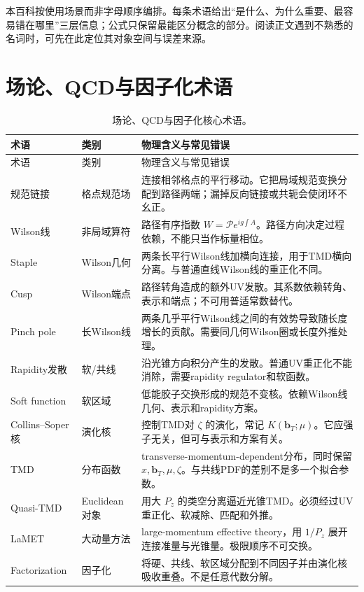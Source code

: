 \documentclass[UTF8,12pt,a4paper,twoside,openany]{ctexbook}
\newcommand{\bT}{\boldsymbol b_T}
\begin{document}
本百科按使用场景而非字母顺序编排。每条术语给出“是什么、为什么重要、最容易错在哪里”三层信息；公式只保留最能区分概念的部分。阅读正文遇到不熟悉的名词时，可先在此定位其对象空间与误差来源。

\section{场论、QCD与因子化术语}

{\small
\begin{longtable}{L{2.8cm}L{1.9cm}L{8.7cm}}
\caption{场论、QCD与因子化核心术语。}\label{tab:glossary-theory}\\
\toprule
术语 & 类别 & 物理含义与常见错误 \\
\midrule
\endfirsthead
\toprule
术语 & 类别 & 物理含义与常见错误 \\
\midrule
\endhead
\bottomrule
\endfoot
规范链接 & 格点规范场 & 连接相邻格点的平行移动。它把局域规范变换分配到路径两端；漏掉反向链接或共轭会使闭环不幺正。 \\
Wilson线 & 非局域算符 & 路径有序指数 \(W=\mathcal P e^{ig\int A}\)。路径方向决定过程依赖，不能只当作标量相位。 \\
Staple & Wilson几何 & 两条长平行Wilson线加横向连接，用于TMD横向分离。与普通直线Wilson线的重正化不同。 \\
Cusp & Wilson端点 & 路径转角造成的额外UV发散。其系数依赖转角、表示和端点；不可用普适常数替代。 \\
Pinch pole & 长Wilson线 & 两条几乎平行Wilson线之间的有效势导致随长度增长的贡献。需要同几何Wilson圈或长度外推处理。 \\
Rapidity发散 & 软/共线 & 沿光锥方向积分产生的发散。普通UV重正化不能消除，需要rapidity regulator和软函数。 \\
Soft function & 软区域 & 低能胶子交换形成的规范不变核。依赖Wilson线几何、表示和rapidity方案。 \\
Collins--Soper核 & 演化核 & 控制TMD对 \(\zeta\) 的演化，常记 \(K(\bT;\mu)\)。它应强子无关，但可与表示和方案有关。 \\
TMD & 分布函数 & transverse-momentum-dependent分布，同时保留 \(x,\bT,\mu,\zeta\)。与共线PDF的差别不是多一个拟合参数。 \\
Quasi-TMD & Euclidean对象 & 用大 \(P_z\) 的类空分离逼近光锥TMD。必须经过UV重正化、软减除、匹配和外推。 \\
LaMET & 大动量方法 & large-momentum effective theory，用 \(1/P_z\) 展开连接准量与光锥量。极限顺序不可交换。 \\
Factorization & 因子化 & 将硬、共线、软区域分配到不同因子并由演化核吸收重叠。不是任意代数分解。 \\

\end{longtable}}
\end{document}
